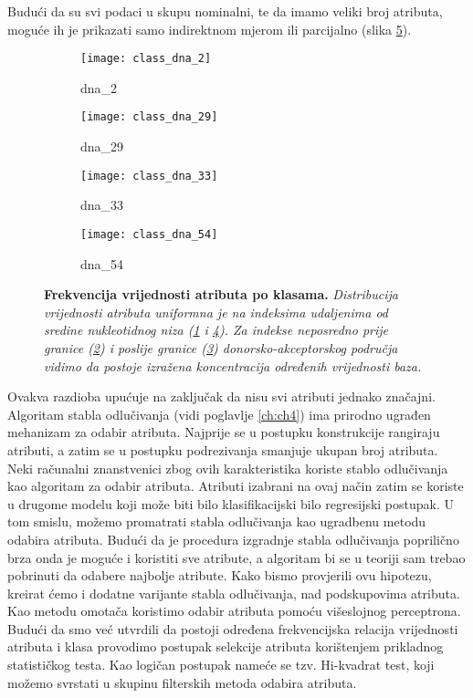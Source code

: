 Budući da su svi podaci u skupu nominalni, te da imamo veliki broj atributa, moguće ih je prikazati samo indirektnom mjerom ili parcijalno (slika \ref{fig:class_dna_x}).
\begin{center}
   \begin{figure}[ht!]
   \begin{subfigure}{.5\textwidth}
         \texttt{[image: class\_dna\_2]}
         \caption{dna{\_}2}
         \label{fig:class_dna_2}
   \end{subfigure}
   \begin{subfigure}{.5\textwidth}
         \texttt{[image: class\_dna\_29]}
         \caption{dna{\_}29}
         \label{fig:class_dna_29}
   \end{subfigure}
   \begin{subfigure}{.5\textwidth}
         \texttt{[image: class\_dna\_33]}
         \caption{dna{\_}33}
         \label{fig:class_dna_33}
   \end{subfigure}
   \begin{subfigure}{.5\textwidth}
         \texttt{[image: class\_dna\_54]}
         \caption{dna{\_}54}
         \label{fig:class_dna_54}
   \end{subfigure}
   \caption[Dijagram rasipanja vrijednosti atributa po klasama]
   {\textbf{Frekvencija vrijednosti atributa po klasama.}\textit{ Distribucija vrijednosti atributa uniformna je na indeksima udaljenima od sredine nukleotidnog niza (\ref{fig:class_dna_2} i \ref{fig:class_dna_54}). Za indekse neposredno prije granice (\ref{fig:class_dna_29}) i poslije granice (\ref{fig:class_dna_33}) donorsko-akceptorskog područja vidimo da postoje izražena koncentracija određenih vrijednosti baza.}}
    \label{fig:class_dna_x}
   \end{figure}
\end{center}
Ovakva razdioba upućuje na zaključak da nisu svi atributi jednako značajni. Algoritam stabla odlučivanja (vidi poglavlje \ref{ch:ch4}) ima prirodno ugrađen mehanizam za odabir atributa. Najprije se u postupku konstrukcije rangiraju atributi, a zatim se u postupku podrezivanja smanjuje ukupan broj atributa. Neki računalni znanstvenici\cite{Grabczewski01} zbog ovih karakteristika koriste stablo odlučivanja kao algoritam za odabir atributa. Atributi izabrani na ovaj način zatim se koriste u drugome modelu koji može biti bilo klasifikacijski bilo regresijski postupak. U tom smislu, možemo promatrati stabla odlučivanja kao ugradbenu metodu odabira atributa. Budući da je procedura izgradnje stabla odlučivanja poprilično brza onda je moguće i koristiti sve atribute, a algoritam bi se u teoriji sam trebao pobrinuti da odabere najbolje atribute.
Kako bismo provjerili ovu hipotezu, kreirat ćemo i dodatne varijante stabla odlučivanja, nad podskupovima atributa. Kao metodu omotača koristimo odabir atributa pomoću višeslojnog perceptrona.
Budući da smo već utvrdili da postoji određena frekvencijska relacija vrijednosti atributa i klasa provodimo postupak selekcije atributa korištenjem prikladnog statističkog testa. Kao logičan postupak nameće se tzv. Hi-kvadrat test, koji možemo svrstati u skupinu filterskih metoda odabira atributa.
